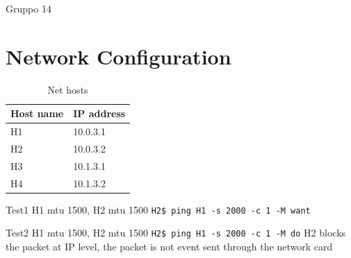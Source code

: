 \documentclass{exam}
\begin{document}
\newcommand{\LoggaEng}{
	\textsc{\Huge Uppsala University}\\[0.7cm]
	\texttt{[image: Uppsala\_University\_seal\_svg.png]}\\[0.5cm]
}


\begin{titlepage}

	\center


	\LoggaSwe



	\Large Gruppo 14\\



	\vfill

\end{titlepage}
\pagebreak


\section{Network Configuration}
\begin{table}
  \caption{Net hosts}\label{tab:net-hosts}
  \begin{center}
    \begin{tabular}{|l|l|}
      \hline
      \textbf{Host name} & \textbf{IP address} \\
      \hline
      H1 & 10.0.3.1 \\
      \hline
      H2 & 10.0.3.2 \\
      \hline
      H3 & 10.1.3.1 \\
      \hline
      H4 & 10.1.3.2 \\
      \hline
    \end{tabular}
  \end{center}
\end{table}

Test1
H1 mtu 1500, H2 mtu 1500
\verb|H2$ ping H1 -s 2000 -c 1 -M want|

Test2
H1 mtu 1500, H2 mtu 1500
\verb|H2$ ping H1 -s 2000 -c 1 -M do|
H2 blocks the packet at IP level, the packet is not event sent through the network card
\end{document}
